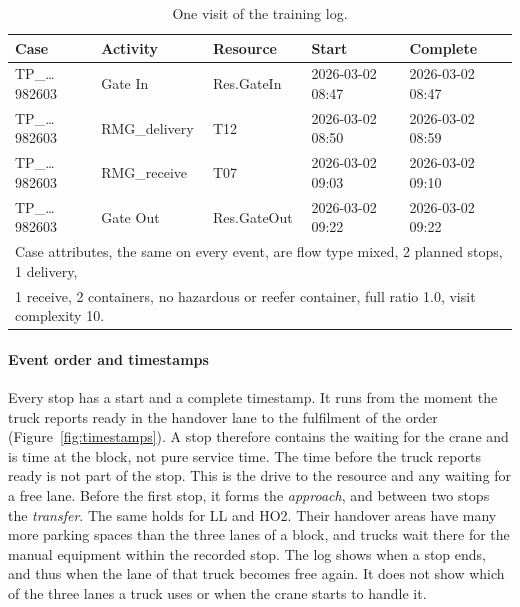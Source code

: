 \begin{table}[htbp]
\centering
\small
\begin{tabular}{lllll}
\toprule
\textbf{Case} & \textbf{Activity} & \textbf{Resource} & \textbf{Start} & \textbf{Complete} \\
\midrule
TP\_\ldots 982603 & Gate In      & Res.GateIn  & 2026-03-02 08:47 & 2026-03-02 08:47 \\
TP\_\ldots 982603 & RMG\_delivery & T12        & 2026-03-02 08:50 & 2026-03-02 08:59 \\
TP\_\ldots 982603 & RMG\_receive  & T07        & 2026-03-02 09:03 & 2026-03-02 09:10 \\
TP\_\ldots 982603 & Gate Out     & Res.GateOut & 2026-03-02 09:22 & 2026-03-02 09:22 \\
\midrule
\multicolumn{5}{l}{\footnotesize Case attributes, the same on every event, are flow type mixed, 2 planned stops, 1 delivery,} \\
\multicolumn{5}{l}{\footnotesize 1 receive, 2 containers, no hazardous or reefer container, full ratio 1.0, visit complexity 10.} \\
\bottomrule
\end{tabular}
\caption{One visit of the training log.}
\label{tab:eventlog_excerpt}
\end{table}

\paragraph{Event order and timestamps}
\label{sec:timestamp_semantics}
Every stop has a start and a complete timestamp. It runs from the moment the truck
reports ready in the handover lane to the fulfilment of the order
(Figure~\ref{fig:timestamps}). A stop therefore contains the waiting for the crane
and is time at the block, not pure service time. The time before the truck reports
ready is not part of the stop. This is the drive to the resource and any waiting
for a free lane. Before the first stop, it forms the \emph{approach}, and between
two stops the \emph{transfer}. The same holds for LL and HO2. Their handover areas
have many more parking spaces than the three lanes of a block, and trucks wait
there for the manual equipment within the recorded stop. The log shows when a
stop ends, and thus when the lane of that truck becomes free again. It does not
show which of the three lanes a truck uses or when the crane starts to handle it.

